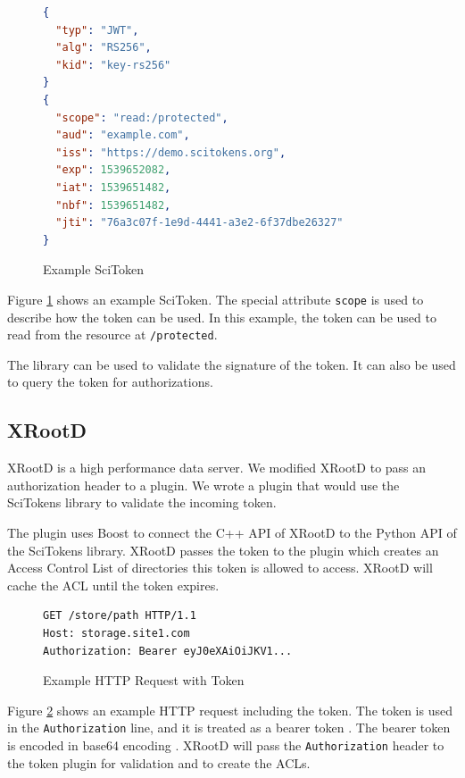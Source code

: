 \documentclass{webofc}
\begin{document}

\begin{figure}[ht]
\begin{lstlisting}[language=json,firstnumber=1]
{
  "typ": "JWT",
  "alg": "RS256",
  "kid": "key-rs256"
}
{
  "scope": "read:/protected",
  "aud": "example.com",
  "iss": "https://demo.scitokens.org",
  "exp": 1539652082,
  "iat": 1539651482,
  "nbf": 1539651482,
  "jti": "76a3c07f-1e9d-4441-a3e2-6f37dbe26327"
}
\end{lstlisting}
\caption{Example SciToken}
\label{fig:scitoken}
\end{figure}

Figure \ref{fig:scitoken} shows an example SciToken.  The special attribute \texttt{scope} is used to describe how the token can be used.  In this example, the token can be used to read from the resource at \texttt{/protected}.

The library can be used to validate the signature of the token.  It can also be used to query the token for authorizations.


\subsection{XRootD}
\label{sec:xrootd}

XRootD is a high performance data server.  We modified XRootD to pass an authorization header to a plugin.  We wrote a plugin \cite{xrootd-scitokens} that would use the SciTokens library to validate the incoming token.

The plugin uses Boost \cite{dawes2009boost} to connect the C++ API of XRootD to the Python API of the SciTokens library.  XRootD passes the token to the plugin which creates an Access Control List of directories this token is allowed to access.  XRootD will cache the ACL until the token expires.

\begin{figure}[ht]
\begin{lstlisting}[language=httprequest,firstnumber=1]
GET /store/path HTTP/1.1
Host: storage.site1.com
Authorization: Bearer eyJ0eXAiOiJKV1...
\end{lstlisting}
    \caption{Example HTTP Request with Token}
    \label{fig:examplerequest}
\end{figure}

Figure \ref{fig:examplerequest} shows an example HTTP request including the token.  The token is used in the \texttt{Authorization} line, and it is treated as a bearer token \cite{jones2012oauth}.  The bearer token is encoded in base64 encoding \cite{josefsson2006base16}.  XRootD will pass the \texttt{Authorization} header to the token plugin for validation and to create the ACLs.
\end{document}
